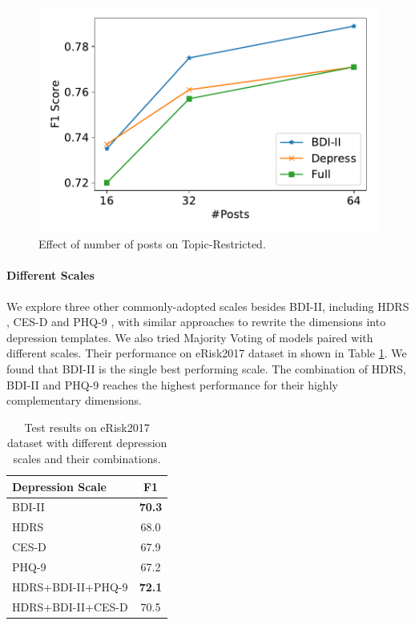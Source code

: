\documentclass{article}
\begin{document}
\begin{figure}[h]
    \centering
    \includegraphics[width=0.8\columnwidth]{figures/post_numbers.pdf}
    \caption{Effect of number of posts on Topic-Restricted.}
    \label{fig:post_numbers}
\end{figure}

\paragraph{Different Scales}
We explore three other commonly-adopted scales besides BDI-II, including HDRS \cite{hamilton1986hamilton}, CES-D \cite{Lenore1977CES-D} and PHQ-9 \cite{kroenke2001phq}, with similar approaches to rewrite the dimensions into depression templates. We also tried Majority Voting of models paired with different scales. Their performance on eRisk2017 dataset in shown in Table \ref{tab:scales}. We found that BDI-II is the single best performing scale. The combination of HDRS, BDI-II and PHQ-9 reaches the highest performance for their highly complementary dimensions. 

\begin{table}[h]
    \centering
	\small
    \begin{tabular}{l|c}
        \hline
        Depression Scale & F1 \\
        \hline
        BDI-II & \textbf{70.3} \\
        HDRS & 68.0 \\
        CES-D & 67.9 \\
        PHQ-9 & 67.2\\
        \hline
        HDRS+BDI-II+PHQ-9 & \textbf{72.1} \\
        HDRS+BDI-II+CES-D & 70.5 \\
        \hline
    \end{tabular}
    \caption{Test results on eRisk2017 dataset with different depression scales and their combinations.}
    \label{tab:scales}
\end{table}
\end{document}
